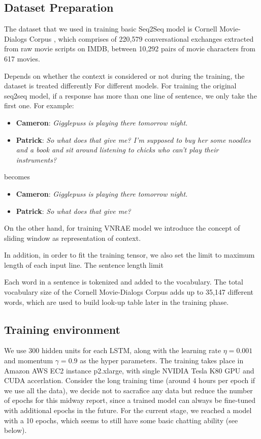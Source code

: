 \subsection{Dataset Preparation}
The dataset that we used in training basic Seq2Seq model is Cornell Movie-Dialogs Corpus \cite{corpus}, which comprises of 220,579 conversational exchanges extracted from raw movie scripts on IMDB, between 10,292 pairs of movie characters from 617 movies. 

Depends on whether the context is considered or not during the training, the dataset is treated differently For different models. For training the original seq2seq model, if a response has more than one line of sentence, we only take the first one. For example:

\begin{itemize}
\item[~] \textbf{Cameron}: \textit{Gigglepuss is playing there tomorrow night.}
\item[~] \textbf{Patrick}: \textit{So what does that give me?  I'm supposed to buy her some noodles and a book and sit around listening to chicks who can't play their instruments?}
\end{itemize}

becomes

\begin{itemize}
\item[~] \textbf{Cameron}: \textit{Gigglepuss is playing there tomorrow night.}
\item[~] \textbf{Patrick}: \textit{So what does that give me?}
\end{itemize}

On the other hand, for training VNRAE model we introduce the concept of sliding window as representation of context.


In addition, in order to fit the training tensor, we also set the limit to maximum length of each input line. The sentence length limit


Each word in a sentence is tokenized and added to the vocabulary. The total vocabulary size of the Cornell Movie-Dialogs Corpus adds up to 35,147 different words, which are used to build look-up table later in the training phase.

\subsection{Training environment}
We use 300 hidden units for each LSTM, along with the learning rate $\eta=0.001$ and momentum $\gamma=0.9$ as the hyper parameters. The training takes place in Amazon AWS EC2 instance p2.xlarge, with single NVIDIA Tesla K80 GPU and CUDA accerlation. Consider the long training time (around 4 hours per epoch if we use all the data), we decide not to sacrafice any data but reduce the number of epochs for this midway report, since a trained model can always be fine-tuned with additional epochs in the future. For the current stage, we reached a model with a 10 epochs, which seems to still have some basic chatting ability (see below).

